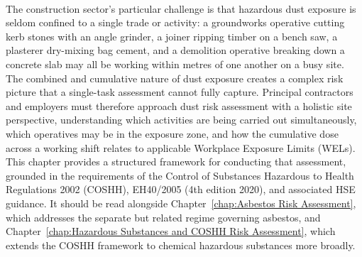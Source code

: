 \paragraph{}
The construction sector's particular challenge is that hazardous dust exposure is seldom confined to a single trade or activity: a groundworks operative cutting kerb stones with an angle grinder, a joiner ripping timber on a bench saw, a plasterer dry-mixing bag cement, and a demolition operative breaking down a concrete slab may all be working within metres of one another on a busy site. The combined and cumulative nature of dust exposure creates a complex risk picture that a single-task assessment cannot fully capture. Principal contractors and employers must therefore approach dust risk assessment with a holistic site perspective, understanding which activities are being carried out simultaneously, which operatives may be in the exposure zone, and how the cumulative dose across a working shift relates to applicable Workplace Exposure Limits (WELs). This chapter provides a structured framework for conducting that assessment, grounded in the requirements of the Control of Substances Hazardous to Health Regulations 2002 (COSHH), EH40/2005 (4th edition 2020), and associated HSE guidance. It should be read alongside Chapter~\ref{chap:Asbestos Risk Assessment}, which addresses the separate but related regime governing asbestos, and Chapter~\ref{chap:Hazardous Substances and COSHH Risk Assessment}, which extends the COSHH framework to chemical hazardous substances more broadly.


